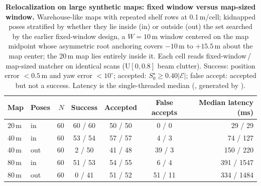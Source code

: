\begin{table}[t]
\centering
\caption{\textbf{Relocalization on large synthetic maps: fixed window versus map-sized window.} Warehouse-like maps with repeated shelf rows at 0.1\,m/cell; kidnapped poses stratified by whether they lie inside (in) or outside (out) the set searched by the earlier fixed-window design, a $W=10$\,m window centered on the map midpoint whose asymmetric root anchoring covers $-10$\,m to $+15.5$\,m about the map center; the 20\,m map lies entirely inside it. Each cell reads fixed-window\,/\,map-sized matcher on identical scans (U$[0,0.8]$ beam clutter). Success: position error $<0.5$\,m and yaw error $<10^\circ$; accepted: $S_0^\star\ge0.40|\mathcal{E}|$; false accept: accepted but not a success. Latency is the single-threaded median (, generated by ).}\label{tab:bbs_large}
\small
\begin{tabular}{@{}llrcccr@{}}
\toprule
Map & Poses & $N$ & Success & Accepted & False accepts & Median latency (ms) \\
\midrule
20\,m & in & 60 & 60 / 60 & 50 / 50 & 0 / 0 & 29 / 29 \\
40\,m & in & 60 & 53 / 54 & 57 / 57 & 4 / 3 & 74 / 127 \\
40\,m & out & 60 & 2 / 50 & 41 / 48 & 39 / 3 & 150 / 220 \\
80\,m & in & 60 & 51 / 53 & 54 / 55 & 6 / 4 & 391 / 1547 \\
80\,m & out & 60 & 0 / 41 & 51 / 52 & 51 / 11 & 334 / 1484 \\
\bottomrule
\end{tabular}
\end{table}

